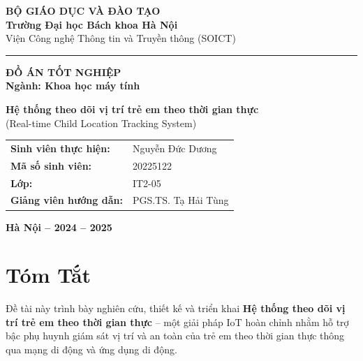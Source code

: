 \documentclass[13pt, a4paper]{report}
\newcommand{\systemname}{Hệ thống theo dõi vị trí trẻ em theo thời gian thực}
\newcommand{\authorname}{Nguyễn Đức Dương}
\newcommand{\mssv}{20225122}
\newcommand{\advisor}{PGS.TS. Tạ Hải Tùng}
\newcommand{\department}{Viện Công nghệ Thông tin và Truyền thông (SOICT)}
\newcommand{\university}{Trường Đại học Bách khoa Hà Nội}
\newcommand{\academicyear}{2024 -- 2025}
\begin{document}

\begin{titlepage}
\begin{center}
{\large \textbf{BỘ GIÁO DỤC VÀ ĐÀO TẠO}}\\[4pt]
{\large \textbf{\university}}\\[4pt]
{\large \department}

\vspace{1.5cm}
\rule{14cm}{0.4pt}
\vspace{0.8cm}

{\LARGE \textbf{ĐỒ ÁN TỐT NGHIỆP}}\\[0.5cm]
{\large \textbf{Ngành: Khoa học máy tính}}

\vspace{1.2cm}
{\LARGE \textbf{\systemname{}}}\\[0.3cm]
{\large (Real-time Child Location Tracking System)}

\vspace{2cm}
\begin{flushleft}
\hspace{4cm}
\begin{tabular}{ll}
\textbf{Sinh viên thực hiện:} & \authorname{} \\[4pt]
\textbf{Mã số sinh viên:}     & \mssv{} \\[4pt]
\textbf{Lớp:}                 & IT2-05 \\[4pt]
\textbf{Giảng viên hướng dẫn:} & \advisor{} \\
\end{tabular}
\end{flushleft}

\vfill
{\large \textbf{Hà Nội -- \academicyear{}}}
\end{center}
\end{titlepage}


\chapter*{Tóm Tắt}

Đề tài này trình bày nghiên cứu, thiết kế và triển khai \textbf{\systemname{}} -- một giải pháp IoT hoàn chỉnh nhằm hỗ trợ bậc phụ huynh giám sát vị trí và an toàn của trẻ em theo thời gian thực thông qua mạng di động và ứng dụng di động.
\end{document}
